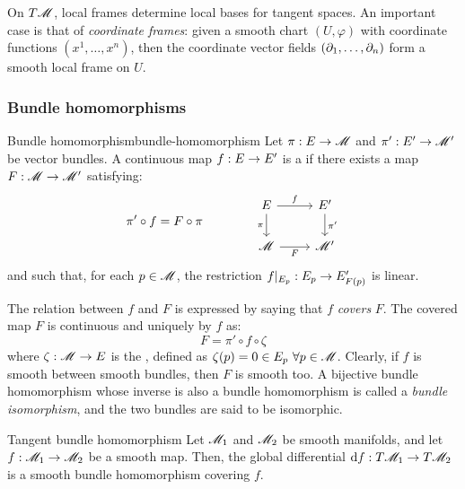 On $ T\mathscr{M} $, local frames determine local bases for tangent spaces. An important case is that of \emph{coordinate frames}: given a smooth chart $ (U , \varphi) $ with coordinate functions $ (x^1 , \dots , x^n) $, then the coordinate vector fields $ (\partial_1 , \dots , \partial_n) $ form a smooth local frame on $ U $.

\subsubsection{Bundle homomorphisms}

\begin{definition}{Bundle homomorphism}{bundle-homomorphism}
  Let $ \pi : E \rightarrow \mathscr{M} $ and $ \pi' : E' \rightarrow \mathscr{M}' $ be vector bundles. A continuous map $ f : E \rightarrow E' $ is a  if there exists a map $ F : \mathscr{M} \rightarrow \mathscr{M}' $ satisfying:
  \begin{equation}
    \pi' \circ f = F \circ \pi
    \qquad \qquad
    \begin{tikzcd}
      E \ar[r , "f"] \ar[d , "\pi" , swap] & E' \ar[d , "\pi'"] \\
      \man \ar[r , "F" , swap] & \man'
    \end{tikzcd}
  \end{equation}
  and such that, for each $ p \in \mathscr{M} $, the restriction $ f \vert_{E_p} : E_p \rightarrow E'_{F(p)} $ is linear.
\end{definition}

The relation between $ f $ and $ F $ is expressed by saying that $ f $ \emph{covers} $ F $. The covered map $ F $ is continuous and uniquely by $ f $ as:
\begin{equation}
  F = \pi' \circ f \circ \zeta
\end{equation}
where $ \zeta : \mathscr{M} \rightarrow E $ is the , defined as $ \zeta(p) = 0 \in E_p \,\,\forall p \in \mathscr{M} $. Clearly, if $ f $ is smooth between smooth bundles, then $ F $ is smooth too.
A bijective bundle homomorphism whose inverse is also a bundle homomorphism is called a \emph{bundle isomorphism}, and the two bundles are said to be isomorphic.

\begin{example}{Tangent bundle homomorphism}{}
  Let $ \mathscr{M}_1 $ and $ \mathscr{M}_2 $ be smooth manifolds, and let $ f : \mathscr{M}_1 \rightarrow \mathscr{M}_2 $ be a smooth map. Then, the global differential $ \mathrm{d} f : T\mathscr{M}_1 \rightarrow T\mathscr{M}_2 $ is a smooth bundle homomorphism covering $ f $.
\end{example}

